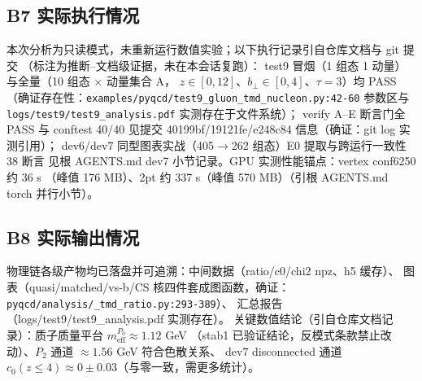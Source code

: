 \documentclass[UTF8]{ctexart}
\begin{document}
\subsection{B7 实际执行情况}
本次分析为只读模式，未重新运行数值实验；以下执行记录引自仓库文档与 git 提交
（标注为\textcolor{relation}{推断--文档级证据}，未在本会话复跑）：
test9 冒烟（1 组态 1 动量）与全量（10 组态 $\times$ 动量集合 A，
$z\in[0,12]$、$b_\perp\in[0,4]$、$\tau=3$）均 PASS
（确证存在性：\texttt{\nolinkurl{examples/pyqcd/test9_gluon_tmd_nucleon.py:42-60}}
参数区与 \texttt{logs/test9/test9\_analysis.pdf} 实测存在于文件系统）；
verify A--E 断言门全 PASS 与 conftest 40/40 见提交 40199bf/19121fe/e248c84
信息（确证：git log 实测引用）；
dev6/dev7 同型图表实战（405$\to$262 组态）E0 提取与跨运行一致性 38 断言
见根 AGENTS.md dev7 小节记录。GPU 实测性能锚点：vertex conf6250 约 36 s
（峰值 176 MB）、2pt 约 337 s（峰值 570 MB）（引根 AGENTS.md torch 并行小节）。

\subsection{B8 实际输出情况}
物理链各级产物均已落盘并可追溯：中间数据（ratio/c0/chi2 npz、h5 缓存）、
图表（quasi/matched/vs-b/CS 核四件套成图函数，确证：
\texttt{\nolinkurl{pyqcd/analysis/_tmd_ratio.py:293-389}}）、
汇总报告（logs/test9/test9\_analysis.pdf 实测存在）。
关键数值结论（引自仓库文档记录）：质子质量平台 $m_{\mathrm{eff}}^{P_0}\approx1.12$ GeV
（stab1 已验证结论，反模式条款禁止改动）、$P_2$ 通道 $\approx1.56$ GeV 符合色散关系、
dev7 disconnected 通道 $c_0(z\le4)\approx0\pm0.03$（与零一致，需更多统计）。
\end{document}
